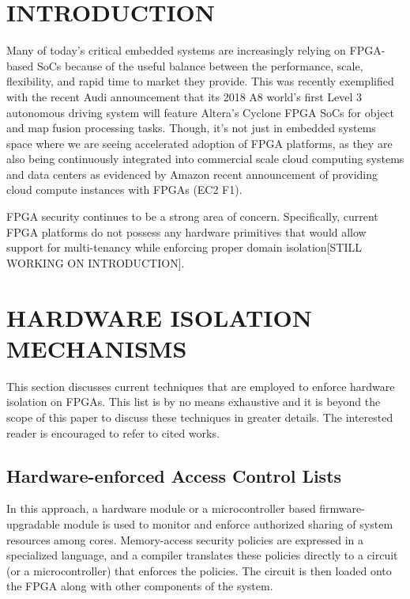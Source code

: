 \documentclass[sigconf]{acmart}
\theoremstyle{plain}
\theoremstyle{remark}
\begin{document}
\maketitle


\section{INTRODUCTION}\label{sec:intro}
Many of today's critical embedded systems are increasingly relying on FPGA-based SoCs because of the useful balance between the performance, scale, flexibility, and rapid time to market they provide. This was recently exemplified with the recent Audi announcement that its 2018 A8 world's first Level 3 autonomous driving system will feature Altera's Cyclone FPGA SoCs for object and map fusion processing tasks. Though, it's not just in embedded systems space where we are seeing accelerated adoption of FPGA platforms, as they are also being continuously integrated into commercial scale cloud computing systems and data centers as evidenced by Amazon recent announcement of providing cloud compute instances with FPGAs (EC2 F1).

FPGA security continues to be a strong area of concern. Specifically, current FPGA platforms do not possess any hardware primitives that would allow support for multi-tenancy while enforcing proper domain isolation[STILL WORKING ON INTRODUCTION].

\section{HARDWARE ISOLATION MECHANISMS} \label{sec:problem_definition}

This section discusses current techniques that are employed to enforce hardware isolation on FPGAs. This list is by no means exhaustive and it is beyond the scope of this paper to discuss these techniques in greater details. The interested reader is encouraged to refer to cited works.


\subsection{Hardware-enforced Access Control Lists}

In this approach, a hardware module or a microcontroller based firmware-upgradable module is used to monitor and enforce authorized sharing of system
resources among cores. Memory-access security policies are expressed in a specialized language, and a compiler translates these policies directly to a circuit (or a microcontroller) that enforces the policies. The circuit is then loaded onto the FPGA along with other components of the system.
\end{document}
